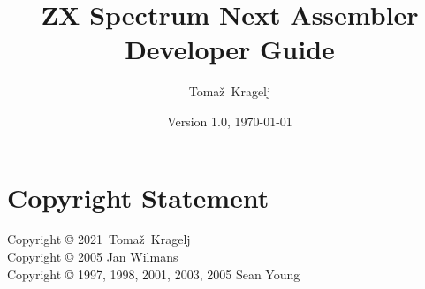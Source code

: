 \documentclass[12pt,twoside,openright,a4paper]{book}
\newcommand{\AuthorName}{Toma\v{z}}
\newcommand{\AuthorNameSurname}{\AuthorName ~Kragelj}
\newcommand{\LatestVersion}{1.0}
\newcommand{\LatestYear}{2021}
\begin{document}
\frontmatter






\title{ZX Spectrum Next Assembler Developer Guide}
\author{\AuthorNameSurname}
\date{Version \LatestVersion, \today}

\maketitle

\afterpage{\aftergroup\restoregeometry}


\chapter*{Copyright Statement}

Copyright {\copyright} \LatestYear ~\AuthorNameSurname\\	%
Copyright {\copyright} 2005 Jan Wilmans\\
Copyright {\copyright} 1997, 1998, 2001, 2003, 2005 Sean Young
\end{document}
